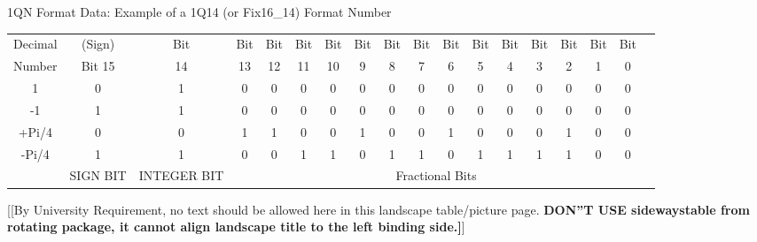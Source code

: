 \begin{landscape}
\begin{stable}[!hbtp]
  \centering
  \caption{1QN Format Data: Example of a 1Q14 (or Fix16\_14) Format Number}
    \begin{tabular}{|c|c|c|c|c|c|c|c|c|c|c|c|c|c|c|c|c|c|}
    \toprule
    Decimal & (Sign) & Bit  & Bit  & Bit & Bit  & Bit  & Bit  & Bit  & Bit  & Bit  & Bit  & Bit  & Bit  & Bit  & Bit  & Bit  \\
    Number & Bit 15   &   14 &   13 &   12 &   11 &   10 &   9 &   8 &   7 &   6 &   5 &   4 &   3 &   2 &   1 &   0 \\
    \midrule
    1     & 0     & 1     & 0     & 0     & 0     & 0     & 0     & 0     & 0     & 0     & 0     & 0     & 0     & 0     & 0     & 0 \\
    -1    & 1     & 1     & 0     & 0     & 0     & 0     & 0     & 0     & 0     & 0     & 0     & 0     & 0     & 0     & 0     & 0 \\
    +Pi/4 & 0     & 0     & 1     & 1     & 0     & 0     & 1     & 0     & 0     & 1     & 0     & 0     & 0     & 1     & 0     & 0 \\
    -Pi/4 & 1     & 1     & 0     & 0     & 1     & 1     & 0     & 1     & 1     & 0     & 1     & 1     & 1     & 1     & 0     & 0 \\
          & SIGN BIT & INTEGER BIT & \multicolumn{14}{c}{Fractional Bits}     \\
    \bottomrule
    \end{tabular}%

            [{\small [By University Requirement, no text should be allowed here in this landscape table/picture page. \textbf{ DON''T 
USE sidewaystable from rotating package, it cannot align landscape title to the left binding side.]}}]
  \label{tab:1QNformat}%
\end{stable}
\end{landscape}
